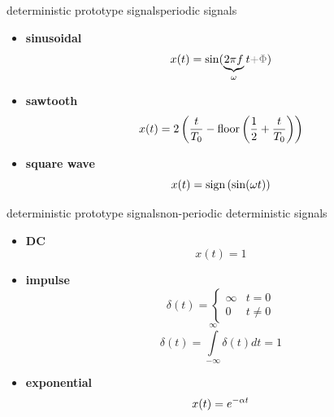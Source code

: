 \begin{frame}{deterministic prototype signals}{periodic signals}
            \begin{itemize}
                \item   \textbf{sinusoidal}
                    \[x(t) = \sin(\underbrace{2\pi f}_{\omega} t {\color{gray}{+ \Phi}})\]
                \item<3->   \textbf{sawtooth}
                    \begin{equation*}
                        x(t) = 2\left(\frac{t}{T_0}-\operatorname*{floor}\left(\frac{1}{2}+\frac{t}{T_0}\right)\right)
                    \end{equation*}
                \item<4->   \textbf{square wave}
                    \[x(t) = \operatorname*{sign}\left(\sin(\omega t)\right)\]
            \end{itemize}
\end{frame}
\begin{frame}{deterministic prototype signals}{non-periodic deterministic signals}
    \begin{itemize}
        \item   \textbf{DC}
            \[ x(t) = 1\]
        \item<2->   \textbf{impulse}
            \begin{equation*}
                \delta(t) = 
                    \begin{cases}
                            \infty & t = 0 \\
                            0   & t \neq 0
                    \end{cases}
            \end{equation*}
            \begin{equation*}
                \delta(t) = \int\limits_{-\infty}^{\infty}{\delta(t) dt = 1}
            \end{equation*}
        \item<3->   \textbf{exponential}
            \[ x(t) = {e}^{-\alpha t}\]
    \end{itemize}
\end{frame}

